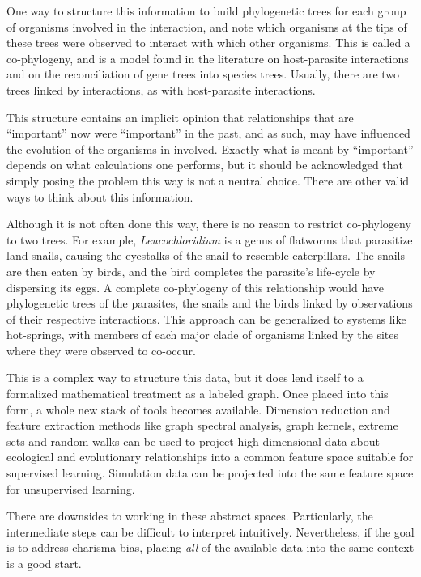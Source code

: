 \documentclass[
10pt, %
a4paper, %
oneside, %
headinclude,footinclude, %
BCOR5mm, %
]{scrartcl}
\begin{document}
One way to structure this information to build phylogenetic trees for each group of organisms involved in the interaction, and note which organisms at the tips of these trees were observed to interact with which other organisms. This is called a co-phylogeny, and is a model found in the literature on host-parasite interactions and on the reconciliation of gene trees into species trees. Usually, there are two trees linked by interactions, as with host-parasite interactions.

This structure contains an implicit opinion that relationships that are ``important'' now were ``important'' in the past, and as such, may have influenced the evolution of the organisms in involved. Exactly what is meant by ``important'' depends on what calculations one performs, but it should be acknowledged that simply posing the problem this way is not a neutral choice. There are other valid ways to think about this information.







Although it is not often done this way, there is no reason to restrict co-phylogeny to two trees. For example, {\em Leucochloridium} is a genus of flatworms that parasitize land snails, causing the eyestalks of the snail to resemble caterpillars. The snails are then eaten by birds, and the bird completes the parasite's life-cycle by dispersing its eggs. A complete co-phylogeny of this relationship would have phylogenetic trees of the parasites, the snails and the birds linked by observations of their respective interactions. This approach can be generalized to systems like hot-springs, with members of each major clade of organisms linked by the sites where they were observed to co-occur.

This is a complex way to structure this data, but it does lend itself to a formalized mathematical treatment as a labeled graph. Once placed into this form, a whole new stack of tools becomes available. Dimension reduction and feature extraction methods like graph spectral analysis, graph kernels, extreme sets and random walks can be used to project high-dimensional data about ecological and evolutionary relationships into a common feature space suitable for supervised learning. Simulation data can be projected into the same feature space for unsupervised learning.

There are downsides to working in these abstract spaces. Particularly, the intermediate steps can be difficult to interpret intuitively. Nevertheless, if the goal is to address charisma bias, placing {\em all} of the available data into the same context is a good start. 
\end{document}
